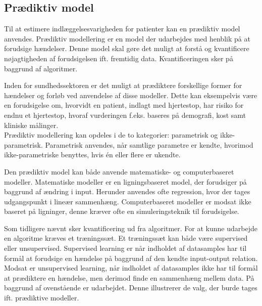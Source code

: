 \subsection{Prædiktiv model}
\noindent
Til at estimere indlæggelsesvarigheden for patienter kan en prædiktiv model anvendes. 
Prædiktiv modellering er en model der udarbejdes med henblik på at forudsige hændelser.  Denne model skal gøre det muligt at forstå og kvantificere nøjagtigheden af forudsigelsen ift. fremtidig data.\cite{Kuhn2013} Kvantificeringen sker på baggrund af algoritmer. 


Inden for sundhedssektoren er det muligt at prædiktere forskellige former for hændelser og forløb ved anvendelse af disse modeller. Dette kan eksempelvis være en forudsigelse om, hvorvidt en patient, indlagt med hjertestop, har risiko for endnu et hjertestop, hvoraf vurderingen f.eks. baseres på demografi, kost samt kliniske målinger\cite{Hastie2008}.  \\

\noindent
Prædiktiv modellering kan opdeles i de to kategorier: parametrisk og ikke-parametrisk. Parametrisk anvendes, når samtlige parametre er kendte, hvorimod ikke-parametriske benyttes, hvis én eller flere er ukendte.\cite{Sheskin2000} %


Den prædiktiv model kan både anvende matematiske- og computerbaseret modeller. Matematiske modeller er en ligningsbaseret model, der forudsiger på baggrund af ændring i input. Herunder anvendes ofte regression, hvor der tages udgangspunkt i lineær sammenhæng. Computerbaseret modeller er modsat ikke baseret på ligninger, denne kræver ofte en simuleringsteknik til forudsigelse.\cite{MathWorks2016}


Som tidligere nævnt sker kvantificering ud fra algoritmer. For at kunne udarbejde en algoritme kræves et træningssæt\cite{DIKU2010}. Et træningssæt kan både være supervised eller unsupervised. Supervised learning er når indholdet af datasamples har til formål at forudsige en hændelse på baggrund af den kendte input-output relation\cite{Brownlee2013}. Modsat er unsupervised learning, når indholdet af datasamples ikke har til formål at prædiktere en hændelse, men derimod finde en sammenhæng mellem data\cite{Brownlee2013, Kuhn2013}. %
På baggrund af ovenstående er  udarbejdet. Denne illustrerer de valg, der burde tages ift. prædiktive modeller.

